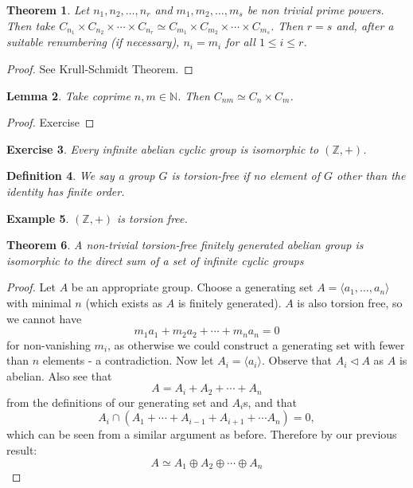 \documentclass[a4paper,10pt]{article}
\newcommand{\NN}{\mathbb{N}}
\newcommand{\ZZ}{\mathbb{Z}}
\newtheorem{thm}{Theorem}
\newtheorem{Def}[thm]{Definition}
\newtheorem{eg}[thm]{Example}
\newtheorem{Ex}[thm]{Exercise}
\newtheorem{Lem}[thm]{Lemma}
\begin{document}
\begin{thm}
Let $n_1, n_2, \dots, n_r$ and $m_1, m_2, \dots, m_s$ be non trivial prime powers. Then take $C_{n_1} \times C_{n_2} \times \cdots \times C_{n_r} \simeq C_{m_1} \times C_{m_2} \times \cdots \times C_{m_s}$. Then $r = s$ and, after a suitable renumbering (if necessary), $n_i = m_i$ for all $1 \leq i \leq r$. 
\end{thm}
\begin{proof}
See Krull-Schmidt Theorem.
\end{proof}


\begin{Lem}
Take coprime $n,m \in \NN$. Then $C_{nm} \simeq C_n \times C_m$.
\end{Lem}
\begin{proof}
Exercise
\end{proof}

\begin{Ex}
Every infinite abelian cyclic group is isomorphic to $(\ZZ, +)$. 
\end{Ex}

\begin{Def}
We say a group $G$ is torsion-free if no element of $G$ other than the identity has finite order. 
\end{Def}
\begin{eg}
$(\ZZ, +)$ is torsion free.
\end{eg}

\begin{thm}
A non-trivial torsion-free finitely generated abelian group is isomorphic to the direct sum of a set of infinite cyclic groups
\end{thm}

\begin{proof}
Let $A$ be an appropriate group. Choose a generating set $A = \langle a_1, \dots, a_n \rangle$ with minimal $n$ (which exists as $A$ is finitely generated). $A$ is also torsion free, so we cannot have
\[ m_1 a_1 + m_2 a_2 + \cdots + m_n a_n = 0 \]
for non-vanishing $m_i$, as otherwise we could construct a generating set with fewer than $n$ elements - a contradiction. Now let $A_i = \langle a_i \rangle$. Observe that $A_i \triangleleft A$ as $A$ is abelian. Also see that
\[ A = A_i + A_2 + \cdots + A_n \]
from the definitions of our generating set and $A_i$s, and that 
\[ A_i \cap (A_1 + \cdots + A_{i-1} + A_{i+1} + \cdots A_n) = 0, \]
which can be seen from a similar argument as before. Therefore by our previous result:
\[ A \simeq A_1 \oplus A_2 \oplus \cdots \oplus A_n \]
\end{proof}
\end{document}
